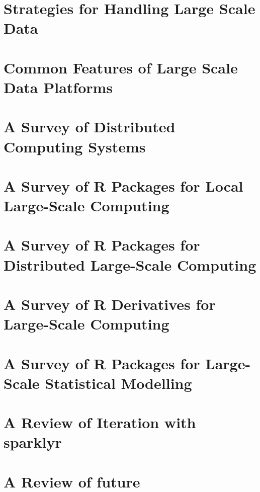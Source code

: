 
\section{Strategies for Handling Large Scale Data}\label{sec:lit-review-strategies}

\section{Common Features of Large Scale Data Platforms}\label{sec:large-scale-features}

\section{A Survey of Distributed Computing Systems}\label{sec:survey-dist-comp-sys}

\section{A Survey of R Packages for Local Large-Scale Computing}\label{sec:survey-r-local-packages}

\section{A Survey of R Packages for Distributed Large-Scale Computing}\label{sec:survey-r-dist-packages}

\section{A Survey of R Derivatives for Large-Scale Computing}\label{sec:survey-r-deriv}

\section{A Survey of R Packages for Large-Scale Statistical Modelling}\label{sec:survey-r-stat-model-packages}

\section{A Review of Iteration with sparklyr}\label{sec:review-iteration-sparklyr}

\section{A Review of future}\label{sec:future-detail}

